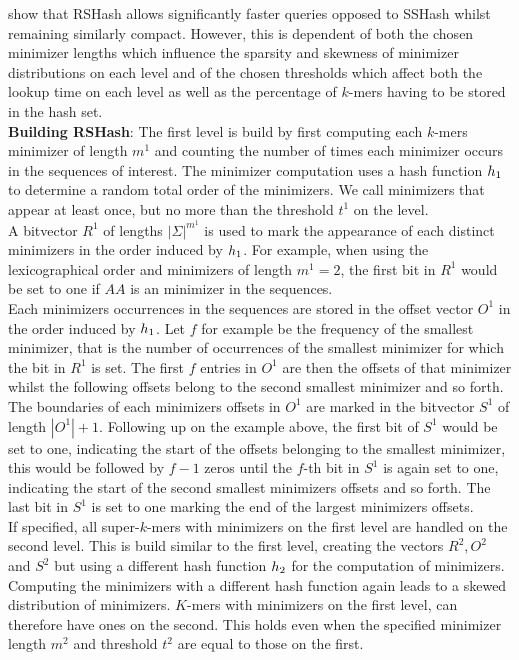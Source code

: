\documentclass[a4paper,titlepage,onecolumn,oneside,12pt,nenglish,titlepage=firstiscover]{scrbook}
\theoremstyle{plain} %
\theoremstyle{definition} %
\theoremstyle{remark} %
\theoremstyle{plain}
\newcommand{\minimizerLength}{m}
\newcommand{\threshold}{t}
\begin{document}
\citet{schulte-mattler_rshash_2026} show that RSHash allows significantly faster queries opposed to SSHash whilst remaining similarly compact. However, this is dependent of both the chosen minimizer lengths which influence the sparsity and skewness of minimizer distributions on each level and of the chosen thresholds which affect both the lookup time on each level as well as the percentage of $k$-mers having to be stored in the hash set.\\

\textbf{Building RSHash}: The first level is build by first computing each $k$-mers minimizer of length $\minimizerLength^1$ and counting the number of times each minimizer occurs in the sequences of interest. The minimizer computation uses a hash function $h_{1}$ to determine a random total order of the minimizers. We call minimizers that appear at least once, but no more than the threshold $\threshold^1$ \infrequent on the level.\\ 
A bitvector $R^1$ of lengths $|\Sigma|^{\minimizerLength^1}$ is used to mark the appearance of each distinct \infrequent minimizers in the order induced by $h_{1}$. For example, when using the lexicographical order and minimizers of length $\minimizerLength^1=2$, the first bit in $R^1$ would be set to one if $AA$ is an \infrequent minimizer in the sequences.\\ 
Each \infrequent minimizers occurrences in the sequences are stored in the offset vector $O^1$ in the order induced by $h_{1}$. Let $f$ for example be the frequency of the smallest \infrequent minimizer, that is the number of occurrences of the smallest minimizer for which the bit in $R^1$ is set. The first $f$ entries in $O^1$ are then the offsets of that minimizer whilst the following offsets belong to the second smallest \infrequent minimizer and so forth.\\
The boundaries of each minimizers offsets in $O^1$ are marked in the bitvector $S^1$ of length $|O^1|+1$. Following up on the example above, the first bit of $S^1$ would be set to one, indicating the start of the offsets belonging to the smallest \infrequent minimizer, this would be followed by $f-1$ zeros until the $f$-th bit in $S^1$ is again set to one, indicating the start of the second smallest \infrequent minimizers offsets and so forth. The last bit in $S^1$ is set to one marking the end of the largest \infrequent minimizers offsets.\\
If specified, all super-$k$-mers with \frequent minimizers on the first level are handled on the second level. This is build similar to the first level, creating the vectors $R^2, O^2$ and $S^2$ but using a different hash function $h_{2}$ for the computation of minimizers. Computing the minimizers with a different hash function again leads to a skewed distribution of minimizers. $K$-mers with \frequent minimizers on the first level, can therefore have \infrequent ones on the second. This holds even when the specified minimizer length $\minimizerLength^2$ and threshold $\threshold^2$ are equal to those on the first.\\
\end{document}
